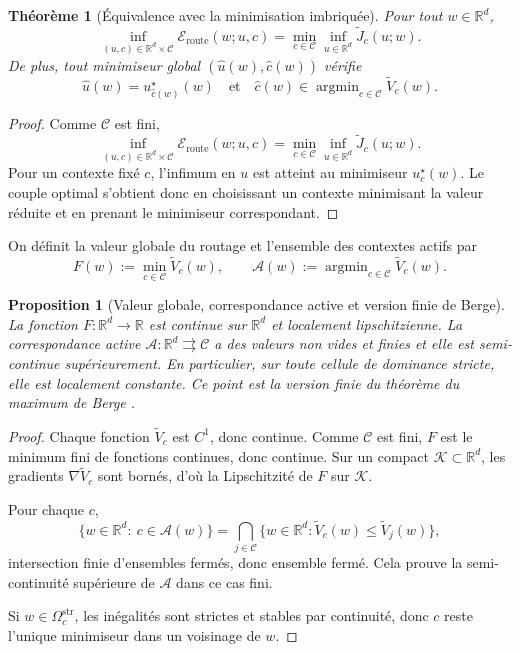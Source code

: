 \documentclass[11pt,a4paper]{article}
\newtheorem{proposition}{Proposition}[section]
\newtheorem{theorem}{Théorème}[section]
\DeclareMathOperator{\argmin}{argmin}
\newcommand{\R}{\mathbb R}
\newcommand{\Ccal}{\mathcal C}
\newcommand{\Acal}{\mathcal A}
\begin{document}
\begin{theorem}[Équivalence avec la minimisation imbriquée]
Pour tout \(w\in\R^d\),
\[
\inf_{(u,c)\in \R^d\times\Ccal}\mathcal E_{\mathrm{route}}(w;u,c)
=
\min_{c\in\Ccal}\inf_{u\in\R^d}\widetilde J_c(u;w).
\]
De plus, tout minimiseur global \((\hat u(w),\hat c(w))\) vérifie
\[
\hat u(w)=u_{\hat c(w)}^\star(w)
\quad\text{et}\quad
\hat c(w)\in\argmin_{c\in\Ccal}\widetilde V_c(w).
\]
\end{theorem}

\begin{proof}
Comme \(\Ccal\) est fini,
\[
\inf_{(u,c)\in \R^d\times\Ccal}\mathcal E_{\mathrm{route}}(w;u,c)
=
\min_{c\in\Ccal}\inf_{u\in\R^d}\widetilde J_c(u;w).
\]
Pour un contexte fixé \(c\), l'infimum en \(u\) est atteint au minimiseur \(u_c^\star(w)\). Le couple optimal s'obtient donc en choisissant un contexte minimisant la valeur réduite et en prenant le minimiseur correspondant.
\end{proof}

On définit la valeur globale du routage et l'ensemble des contextes actifs par
\[
F(w):=\min_{c\in\Ccal}\widetilde V_c(w),
\qquad
\Acal(w):=\argmin_{c\in\Ccal}\widetilde V_c(w).
\]

\begin{proposition}[Valeur globale, correspondance active et version finie de Berge]
La fonction \(F:\R^d\to\R\) est continue sur \(\R^d\) et localement lipschitzienne. La correspondance active \(\Acal:\R^d\rightrightarrows\Ccal\) a des valeurs non vides et finies et elle est semi-continue supérieurement. En particulier, sur toute cellule de dominance stricte, elle est localement constante. Ce point est la version finie du théorème du maximum de Berge \cite{Berge1963}.
\end{proposition}

\begin{proof}
Chaque fonction \(\widetilde V_c\) est \(C^1\), donc continue. Comme \(\Ccal\) est fini, \(F\) est le minimum fini de fonctions continues, donc continue. Sur un compact \(\mathcal K\subset\R^d\), les gradients \(\nabla\widetilde V_c\) sont bornés, d'où la Lipschitzité de \(F\) sur \(\mathcal K\).

Pour chaque \(c\),
\[
\{w\in\R^d:\ c\in\Acal(w)\}
=
\bigcap_{j\in\Ccal}\{w\in\R^d:\widetilde V_c(w)\le \widetilde V_j(w)\},
\]
intersection finie d'ensembles fermés, donc ensemble fermé. Cela prouve la semi-continuité supérieure de \(\Acal\) dans ce cas fini.

Si \(w\in\Omega_c^{\mathrm{str}}\), les inégalités sont strictes et stables par continuité, donc \(c\) reste l'unique minimiseur dans un voisinage de \(w\).
\end{proof}
\end{document}
